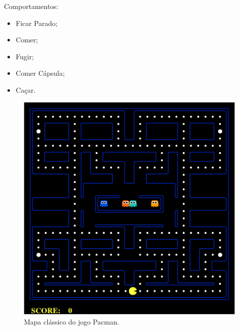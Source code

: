 \documentclass{beamer}
\begin{document}
\begin{frame}
Comportamentos:
\begin{itemize}
	\item Ficar Parado;
	\item Comer;
	\item Fugir;
	\item Comer Cápsula;
	\item Caçar.
\end{itemize}

\begin{figure}[h]
    \centering
    \includegraphics[height=0.5\textheight]{images/pacman_classical_map}
    \caption{Mapa clássico do jogo Pacman.}
\end{figure}
\end{frame}

\end{document}
